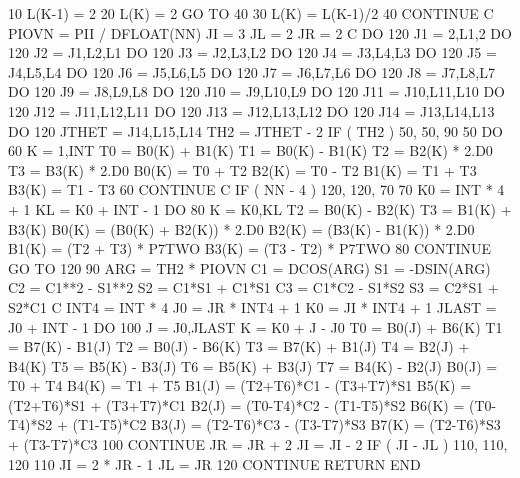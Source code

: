 10        L(K-1) = 2
20        L(K) = 2
          GO TO 40
30        L(K) = L(K-1)/2
40    CONTINUE
C
      PIOVN = PII / DFLOAT(NN)
      JI = 3
      JL = 2
      JR = 2
C
      DO  120 J1 = 2,L1,2
      DO  120 J2 = J1,L2,L1
      DO  120 J3 = J2,L3,L2
      DO  120 J4 = J3,L4,L3
      DO  120 J5 = J4,L5,L4
      DO  120 J6 = J5,L6,L5
      DO  120 J7 = J6,L7,L6
      DO  120 J8 = J7,L8,L7
      DO  120 J9 = J8,L9,L8
      DO  120 J10 = J9,L10,L9
      DO  120 J11 = J10,L11,L10
      DO  120 J12 = J11,L12,L11
      DO  120 J13 = J12,L13,L12
      DO  120 J14 = J13,L14,L13
      DO  120 JTHET = J14,L15,L14
         TH2 = JTHET - 2
         IF ( TH2 ) 50, 50, 90
50       DO 60 K = 1,INT
             T0 = B0(K) + B1(K)
             T1 = B0(K) - B1(K)
             T2 = B2(K) * 2.D0
             T3 = B3(K) * 2.D0
             B0(K) = T0 + T2
             B2(K) = T0 - T2
             B1(K) = T1 + T3
             B3(K) = T1 - T3
60       CONTINUE
C
         IF ( NN - 4 ) 120, 120, 70
70       K0 = INT * 4 + 1
         KL = K0 + INT - 1
         DO 80 K = K0,KL
             T2 = B0(K) - B2(K)
             T3 = B1(K) + B3(K)
             B0(K) = (B0(K) + B2(K)) * 2.D0
             B2(K) = (B3(K) - B1(K)) * 2.D0
             B1(K) = (T2 + T3) * P7TWO
             B3(K) = (T3 - T2) * P7TWO
80       CONTINUE
         GO TO 120
90       ARG = TH2 * PIOVN
         C1 = DCOS(ARG)
         S1 = -DSIN(ARG)
         C2 = C1**2 - S1**2
         S2 = C1*S1 + C1*S1
         C3 = C1*C2 - S1*S2
         S3 = C2*S1 + S2*C1
C
         INT4 = INT * 4
         J0 = JR * INT4 + 1
         K0 = JI * INT4 + 1
         JLAST = J0 + INT - 1
         DO 100 J = J0,JLAST
             K = K0 + J - J0
             T0 = B0(J) + B6(K)
             T1 = B7(K) - B1(J)
             T2 = B0(J) - B6(K)
             T3 = B7(K) + B1(J)
             T4 = B2(J) + B4(K)
             T5 = B5(K) - B3(J)
             T6 = B5(K) + B3(J)
             T7 = B4(K) - B2(J)
             B0(J) = T0 + T4
             B4(K) = T1 + T5
             B1(J) = (T2+T6)*C1 - (T3+T7)*S1
             B5(K) = (T2+T6)*S1 + (T3+T7)*C1
             B2(J) = (T0-T4)*C2 - (T1-T5)*S2
             B6(K) = (T0-T4)*S2 + (T1-T5)*C2
             B3(J) = (T2-T6)*C3 - (T3-T7)*S3
             B7(K) = (T2-T6)*S3 + (T3-T7)*C3
100      CONTINUE
         JR = JR + 2
         JI = JI - 2
         IF ( JI - JL ) 110, 110, 120
110      JI = 2 * JR - 1
         JL = JR
120   CONTINUE
      RETURN
      END

